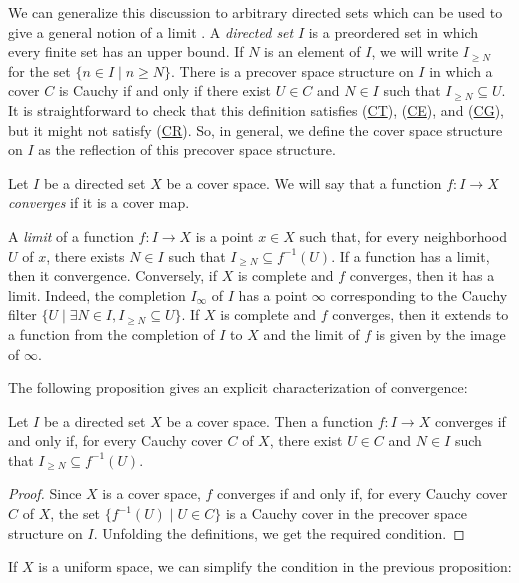 \documentclass[reqno]{amsart}
\newcommand{\axref}[1]{(\hyperref[ax:#1]{#1})}
\theoremstyle{definition}
\theoremstyle{remark}
\numberwithin{figure}{section}
\begin{document}
We can generalize this discussion to arbitrary directed sets which can be used to give a general notion of a limit \cite{limits}.
A \emph{directed set} $I$ is a preordered set in which every finite set has an upper bound.
If $N$ is an element of $I$, we will write $I_{\geq N}$ for the set $\{ n \in I \mid n \geq N \}$.
There is a precover space structure on $I$ in which a cover $C$ is Cauchy if and only if there exist $U \in C$ and $N \in I$ such that $I_{\geq N} \subseteq U$.
It is straightforward to check that this definition satisfies \axref{CT}, \axref{CE}, and \axref{CG}, but it might not satisfy \axref{CR}.
So, in general, we define the cover space structure on $I$ as the reflection of this precover space structure.

\begin{defn}
Let $I$ be a directed set $X$ be a cover space.
We will say that a function $f : I \to X$ \emph{converges} if it is a cover map.
\end{defn}

A \emph{limit} of a function $f : I \to X$ is a point $x \in X$ such that, for every neighborhood $U$ of $x$, there exists $N \in I$ such that $I_{\geq N} \subseteq f^{-1}(U)$.
If a function has a limit, then it convergence.
Conversely, if $X$ is complete and $f$ converges, then it has a limit.
Indeed, the completion $I_\infty$ of $I$ has a point $\infty$ corresponding to the Cauchy filter $\{ U \mid \exists N \in I, I_{\geq N} \subseteq U \}$.
If $X$ is complete and $f$ converges, then it extends to a function from the completion of $I$ to $X$ and the limit of $f$ is given by the image of $\infty$.

The following proposition gives an explicit characterization of convergence:

\begin{prop}
Let $I$ be a directed set $X$ be a cover space.
Then a function $f : I \to X$ converges if and only if, for every Cauchy cover $C$ of $X$, there exist $U \in C$ and $N \in I$ such that $I_{\geq N} \subseteq f^{-1}(U)$.
\end{prop}
\begin{proof}
Since $X$ is a cover space, $f$ converges if and only if, for every Cauchy cover $C$ of $X$, the set $\{ f^{-1}(U) \mid U \in C \}$ is a Cauchy cover in the precover space structure on $I$.
Unfolding the definitions, we get the required condition.
\end{proof}

If $X$ is a uniform space, we can simplify the condition in the previous proposition:
\end{document}
